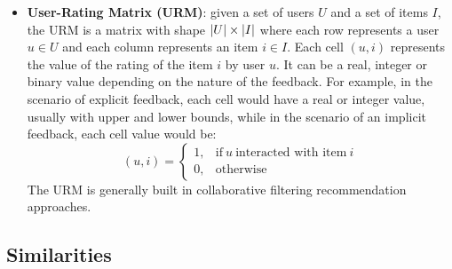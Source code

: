 \begin{itemize}
\item \textbf{User-Rating Matrix (URM)}: given a set of users $U$ and a set of items $I$, the URM is a matrix with shape $\left\lvert U\right\rvert \times \left\lvert I\right\rvert$ where each row represents a user $u \in U$ and each column represents an item $i \in I$. Each cell $(u,i)$ represents the value of the rating of the item $i$ by user $u$. It can be a real, integer or binary value depending on the nature of the feedback. For example, in the scenario of explicit feedback, each cell would have a real or integer value, usually with upper and lower bounds, while in the scenario of an implicit feedback, each cell value would be:\\
\begin{equation*}
(u,i)=
\begin{cases}
1, & \text{if}\ u\ \text{interacted with item}\ i\\
0, & \text{otherwise}
\end{cases}
\end{equation*}
The URM is generally built in collaborative filtering recommendation approaches.
\end{itemize}


\subsection{Similarities}

